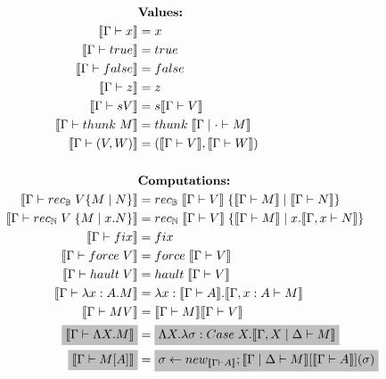 \documentclass[acmsmall]{acmart}
\newcommand{\den}[1]{\llbracket #1\rrbracket}
\begin{document}
\begin{figure}[H]
  \centering
  \scriptsize
  \begin{align*}
  &\textbf{Values:}\\
  \den{\Gamma \vdash x} &= x \\%
  \den{\Gamma \vdash true} &= true \\
  \den{\Gamma \vdash false} &= false \\
  \den{\Gamma \vdash z} &= z \\
  \den{\Gamma \vdash s V} &= s \den{\Gamma \vdash V} \\
  \den{\Gamma \vdash thunk\;M} &= thunk \; \den{\Gamma \;|\; \cdot \vdash M} \\
  \den{\Gamma \vdash (V,W)} &= (\den{\Gamma \vdash V}, \den{\Gamma \vdash W}) \\
  \\
  &\textbf{Computations:} \\
  \den{\Gamma \vdash rec_{\mathbb{B}}\;V \{M\;|\;N\}} &= rec_{\mathbb{B}}\;\den{\Gamma \vdash V} \;\{\den{\Gamma \vdash M}\;|\;\den{\Gamma \vdash N}\} \\
  \den{\Gamma \vdash rec_{\mathbb{N}}\;V\;\{M \;|\; x. N\}} &= rec_{\mathbb{N}}\;\den{\Gamma \vdash V} \;\{\den{\Gamma \vdash M}\;|\;x. \den{\Gamma, x \vdash N}\} \\
  \den{\Gamma \vdash fix} &= fix \\
  \den{\Gamma \vdash force \;V} &= force\;\den{\Gamma \vdash V} \\
  \den{\Gamma \vdash hault\;V} &= hault\;\den{\Gamma \vdash V} \\
  \den{\Gamma \vdash \lambda x :A. M} &= \lambda x:\den{\Gamma \vdash A}. \den{\Gamma, x : A \vdash M} \\
  \den{\Gamma \vdash MV} &= \den{\Gamma \vdash M}\den{\Gamma \vdash V} \\
  \colorbox{lightgray}{$\den{\Gamma \vdash \Lambda X. M}$} &= \colorbox{lightgray}{$\Lambda X. \lambda \sigma : Case\;X. \den{\Gamma,X \;|\;\Delta \vdash M}$} \\
  \colorbox{lightgray}{$\den{\Gamma \vdash M[A]}$} &= \colorbox{lightgray}{$\sigma \leftarrow new_{\den{\Gamma \vdash A}}; \den{\Gamma \;|\;\Delta \vdash M}[\den{\Gamma \vdash A}](\sigma)$} \\

\end{align*}
\end{figure}
\end{document}
